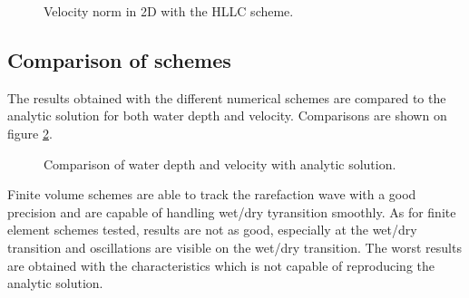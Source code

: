 \begin{figure}[H]
 \centering
  \caption{Velocity norm in 2D with the HLLC scheme.}
  \label{fig:ritter:Ufirstobs1d}
\end{figure}

\subsection{Comparison of schemes}

The results obtained with the different numerical schemes are compared to the analytic solution for both
water depth and velocity. Comparisons are shown on figure \ref{fig:ritter:comparison}.

\begin{figure}[H]
\begin{minipage}[t]{0.5\textwidth}
 \centering
\end{minipage}%
\begin{minipage}[t]{0.5\textwidth}
 \centering
\end{minipage}
\begin{minipage}[t]{0.5\textwidth}
 \centering
\end{minipage}%
\begin{minipage}[t]{0.5\textwidth}
 \centering
\end{minipage}
\begin{minipage}[t]{0.5\textwidth}
 \centering
\end{minipage}%
\begin{minipage}[t]{0.5\textwidth}
 \centering
\end{minipage}
  \caption{Comparison of water depth and velocity with analytic solution.}
  \label{fig:ritter:comparison}
\end{figure}

Finite volume schemes are able to track the rarefaction wave with a good precision and are capable of
handling wet/dry tyransition smoothly. As for finite element schemes tested, results are not as good, especially at 
the wet/dry transition and oscillations are visible on the wet/dry transition.
The worst results are obtained with the characteristics which is not capable of reproducing the analytic solution.

